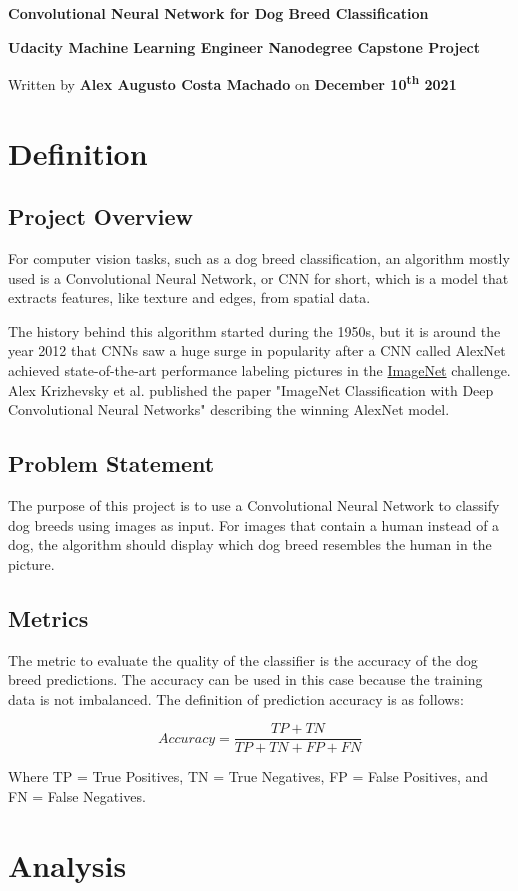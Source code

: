 \documentclass{article}
\newcommand{\doctitle}{Convolutional Neural Network for Dog Breed Classification}
\newcommand{\docsubtitle}{Udacity Machine Learning Engineer Nanodegree Capstone Project}
\newcommand{\docauthor}{Alex Augusto Costa Machado}
\newcommand{\docdate}{December 10\textsuperscript{th} 2021}
\newcommand{\docinfo}{
    \thispagestyle{empty}

    \begin{center}

        \Huge\textbf{\doctitle}
        \vspace{2mm}

        \LARGE\textbf{\docsubtitle}
        
        \vspace{3mm}
        \large
        Written by \textbf{\docauthor} on \textbf{\docdate}

    \end{center}
}
\begin{document}
    \docinfo

    \section{Definition}
    \subsection{Project Overview}

    For computer vision tasks, such as a dog breed classification, an algorithm mostly used is a Convolutional Neural Network, or CNN for short, which is a model that extracts features, like texture and edges, from spatial data.

    The history behind this algorithm started during the 1950s, but it is around the year 2012 that CNNs saw a huge surge in popularity after a CNN called AlexNet achieved state-of-the-art performance labeling pictures in the \href{https://image-net.org/}{ImageNet} challenge. Alex Krizhevsky et al. published the paper "ImageNet Classification with Deep Convolutional Neural Networks" describing the winning AlexNet model.

    \subsection{Problem Statement}

    The purpose of this project is to use a Convolutional Neural Network to classify dog breeds using images as input. For images that contain a human instead of a dog, the algorithm should display which dog breed resembles the human in the picture.

    \subsection{Metrics}

    The metric to evaluate the quality of the classifier is the accuracy of the dog breed predictions. The accuracy can be used in this case because the training data is not imbalanced. The definition of prediction accuracy is as follows:

    \[Accuracy = \frac{TP + TN}{TP +  TN + FP + FN} \]

    Where TP = True Positives, TN = True Negatives, FP = False Positives, and FN = False Negatives.

    \section{Analysis}
\end{document}
